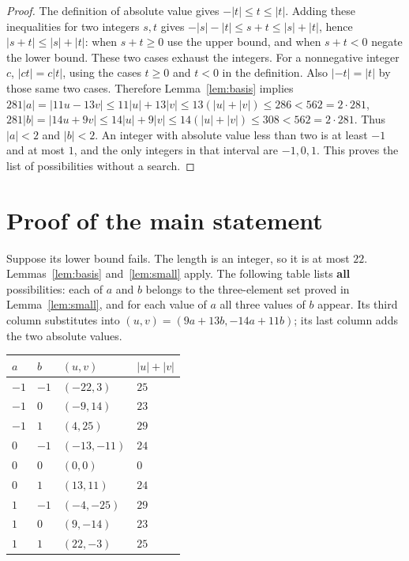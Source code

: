 \documentclass{article}
\begin{document}
\begin{proof}
  The definition of absolute value gives \(-\lvert t\rvert \le t \le \lvert t\rvert\).
  Adding these inequalities for two integers \(s, t\) gives
  \(-\lvert s\rvert - \lvert t\rvert \le s + t \le \lvert s\rvert + \lvert t\rvert\),
  hence \(\lvert s + t\rvert \le \lvert s\rvert + \lvert t\rvert\): when \(s + t \ge 0\)
  use the upper bound, and when \(s + t < 0\) negate the lower bound. These two cases
  exhaust the integers. For a nonnegative integer \(c\),
  \(\lvert ct\rvert = c\lvert t\rvert\), using the cases \(t \ge 0\) and \(t < 0\) in the
  definition. Also \(\lvert -t\rvert = \lvert t\rvert\) by those same two cases.
  Therefore Lemma~\ref{lem:basis} implies
  \(281\lvert a\rvert = \lvert 11u - 13v\rvert \le 11\lvert u\rvert + 13\lvert v\rvert
  \le 13(\lvert u\rvert + \lvert v\rvert) \le 286 < 562 = 2 \cdot 281\),
  \(281\lvert b\rvert = \lvert 14u + 9v\rvert \le 14\lvert u\rvert + 9\lvert v\rvert
  \le 14(\lvert u\rvert + \lvert v\rvert) \le 308 < 562 = 2 \cdot 281\).
  Thus \(\lvert a\rvert < 2\) and \(\lvert b\rvert < 2\). An integer with absolute value
  less than two is at least \(-1\) and at most \(1\), and the only integers in that
  interval are \(-1, 0, 1\). This proves the list of possibilities without a search.
\end{proof}

\section{Proof of the main statement}\label{sec:main-proof}

Suppose its lower bound fails. The length is an integer, so it is at most \(22\).
Lemmas~\ref{lem:basis} and~\ref{lem:small} apply. The following table lists \textbf{all}
possibilities: each of \(a\) and \(b\) belongs to the three-element set proved in
Lemma~\ref{lem:small}, and for each value of \(a\) all three values of \(b\) appear. Its
third column substitutes into \((u, v) = (9a + 13b, -14a + 11b)\); its last column adds
the two absolute values.

\begin{center}
  \begin{tabular}{llll}
    \(a\) & \(b\) & \((u, v)\) & \(\lvert u\rvert + \lvert v\rvert\) \\
    \hline
    \(-1\) & \(-1\) & \((-22, 3)\) & \(25\) \\
    \(-1\) & \(0\) & \((-9, 14)\) & \(23\) \\
    \(-1\) & \(1\) & \((4, 25)\) & \(29\) \\
    \(0\) & \(-1\) & \((-13, -11)\) & \(24\) \\
    \(0\) & \(0\) & \((0, 0)\) & \(0\) \\
    \(0\) & \(1\) & \((13, 11)\) & \(24\) \\
    \(1\) & \(-1\) & \((-4, -25)\) & \(29\) \\
    \(1\) & \(0\) & \((9, -14)\) & \(23\) \\
    \(1\) & \(1\) & \((22, -3)\) & \(25\) \\
  \end{tabular}
\end{center}
\end{document}
